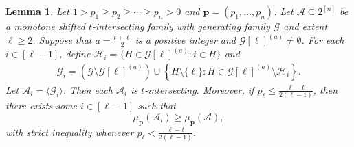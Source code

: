 \documentclass[11pt]{article}
\newtheorem{lemma}[theorem]{Lemma}
\begin{document}
\begin{lemma}\label{pr2}
Let $1 > p_1 \ge p_2 \ge \cdots \ge p_n > 0$ and $\mathbf{p} = (p_1, \dots, p_n)$.
Let $\mathcal{A}\subseteq 2^{[n]}$ be a monotone shifted $t$-intersecting family with  generating family  $\mathcal{G}$ and extent $\ell \geq 2$. Suppose that $a=\frac{t+\ell}{2}$ is a positive integer and  $\mathcal{G}[\ell]^{(a)}\neq \emptyset$. 
For each $i\in [\ell-1]$, define $\mathcal{H}_{i}=\{H\in \mathcal{G}[\ell]^{(a)}: i\in H \}$ and
\begin{align*}
\mathcal{G}_i=\left(\mathcal{G}\setminus\mathcal{G}[\ell]^{(a)}\right)\cup\left\{H\setminus\{\ell\}: H\in\mathcal{G}[\ell]^{(a)}\setminus \mathcal{H}_{i}\right\}.
\end{align*}
Let 
$\mathcal{A}_i=\langle\mathcal{G}_i\rangle$.
Then  each $\mathcal{A}_i$  is $t$-intersecting. Moreover, if $p_{\ell}\leq \frac{\ell-t}{2(\ell-1)}$, then there exists some $i\in [\ell-1]$ such that
$$
\mu_{\mathbf{p}}(\mathcal{A}_i)\geq \mu_{\mathbf{p}}(\mathcal{A}),
$$
with strict inequality  whenever $p_{\ell}<\frac{\ell-t}{2(\ell-1)}$.
\end{lemma}
\end{document}
